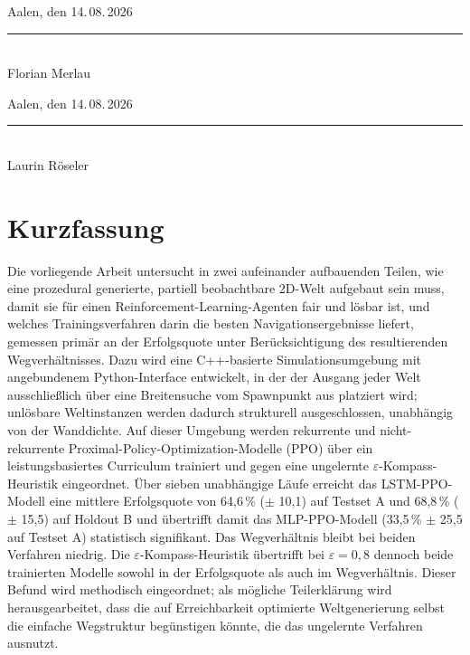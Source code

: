 \documentclass[
  a4paper,
  11pt,
  twoside,
  BCOR=8mm,           %
  headings=big,
  numbers=noenddot,
  listof=totoc,       %
  captions=tableheading,
]{scrreprt}
\begin{document}
\vspace{2.5cm}

\begin{minipage}[t]{0.45\textwidth}
Aalen, den 14.\,08.\,2026\\[1.4cm]
\rule{0.8\textwidth}{0.4pt}\\
Florian Merlau
\end{minipage}
\hfill
\begin{minipage}[t]{0.45\textwidth}
Aalen, den 14.\,08.\,2026\\[1.4cm]
\rule{0.8\textwidth}{0.4pt}\\
Laurin Röseler
\end{minipage}

\clearpage

\chapter*{Kurzfassung}
\thispagestyle{empty}

Die vorliegende Arbeit untersucht in zwei aufeinander aufbauenden Teilen, wie
eine prozedural generierte, partiell beobachtbare 2D-Welt aufgebaut sein muss,
damit sie für einen Reinforcement-Learning-Agenten fair und lösbar ist, und
welches Trainingsverfahren darin die besten Navigationsergebnisse liefert,
gemessen primär an der Erfolgsquote unter Berücksichtigung des resultierenden
Wegverhältnisses. Dazu wird eine C++-basierte Simulationsumgebung mit
angebundenem Python-Interface entwickelt, in der der Ausgang jeder Welt
ausschließlich über eine Breitensuche vom Spawnpunkt aus platziert wird;
unlösbare Weltinstanzen werden dadurch strukturell ausgeschlossen, unabhängig
von der Wanddichte. Auf dieser Umgebung werden rekurrente und
nicht-rekurrente Proximal-Policy-Optimization-Modelle (PPO) über ein
leistungsbasiertes Curriculum trainiert und gegen eine ungelernte
$\varepsilon$-Kompass-Heuristik eingeordnet. Über sieben unabhängige Läufe
erreicht das LSTM-PPO-Modell eine mittlere Erfolgsquote von 64,6\,\%
($\pm$ 10,1) auf Testset A und 68,8\,\% ($\pm$ 15,5) auf Holdout B und
übertrifft damit das MLP-PPO-Modell (33,5\,\% $\pm$ 25,5 auf Testset A)
statistisch signifikant. Das Wegverhältnis bleibt bei beiden Verfahren
niedrig. Die $\varepsilon$-Kompass-Heuristik übertrifft bei
$\varepsilon = 0{,}8$ dennoch beide trainierten Modelle sowohl in der
Erfolgsquote als auch im Wegverhältnis. Dieser Befund wird methodisch
eingeordnet; als mögliche Teilerklärung wird herausgearbeitet, dass die auf
Erreichbarkeit optimierte Weltgenerierung selbst die einfache Wegstruktur
begünstigen könnte, die das ungelernte Verfahren ausnutzt.
\end{document}
